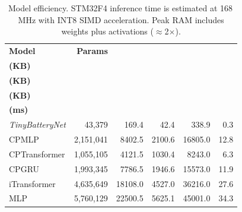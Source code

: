 \begin{table}[t]
\centering
\caption{Model efficiency. STM32F4 inference time is estimated at 168\,MHz with INT8 SIMD acceleration. Peak RAM includes weights plus activations ($\approx$2$\times$).}
\label{tab:efficiency}
\small
\setlength{\tabcolsep}{2.5pt}
\begin{tabular*}{\columnwidth}{@{\extracolsep{\fill}}lrrrrr@{}}
\toprule
\textbf{Model} & \textbf{Params} & \makecell{\textbf{FP32}\\\textbf{(KB)}} & \makecell{\textbf{INT8}\\\textbf{(KB)}} & \makecell{\textbf{RAM}\\\textbf{(KB)}} & \makecell{\textbf{Time}\\\textbf{(ms)}} \\
\midrule
\textit{TinyBatteryNet} & 43,379 & 169.4 & 42.4 & 338.9 & 0.3 \\
CPMLP & 2,151,041 & 8402.5 & 2100.6 & 16805.0 & 12.8 \\
CPTransformer & 1,055,105 & 4121.5 & 1030.4 & 8243.0 & 6.3 \\
CPGRU & 1,993,345 & 7786.5 & 1946.6 & 15573.0 & 11.9 \\
iTransformer & 4,635,649 & 18108.0 & 4527.0 & 36216.0 & 27.6 \\
MLP & 5,760,129 & 22500.5 & 5625.1 & 45001.0 & 34.3 \\
\bottomrule
\end{tabular*}
\end{table}